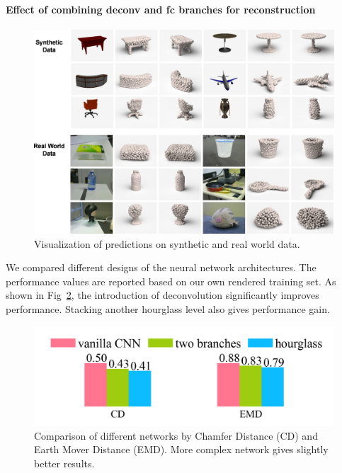 \paragraph{Effect of combining deconv and fc branches for reconstruction}

\begin{figure}[t!]
   \centering
   \vspace{1em}
   \includegraphics[width=0.9\linewidth]{./fig/realworld}
   \caption{Visualization of predictions on synthetic and real world data.}\label{fig:more_examples}
 \end{figure}
We compared different designs of the neural network architectures. The performance values are reported based on our own rendered training set.%
As shown in Fig~\ref{fig:compare_networks}, the introduction of deconvolution significantly improves performance. Stacking another hourglass level also gives performance gain.

\begin{figure}[t!]
  \centering
  \includegraphics[width=\linewidth]{./fig/network_bar}
  \caption{Comparison of different networks by Chamfer Distance (CD) and Earth Mover Distance (EMD). More complex network gives slightly better results. }\label{fig:compare_networks}
  \vspace{-1em}
\end{figure}

